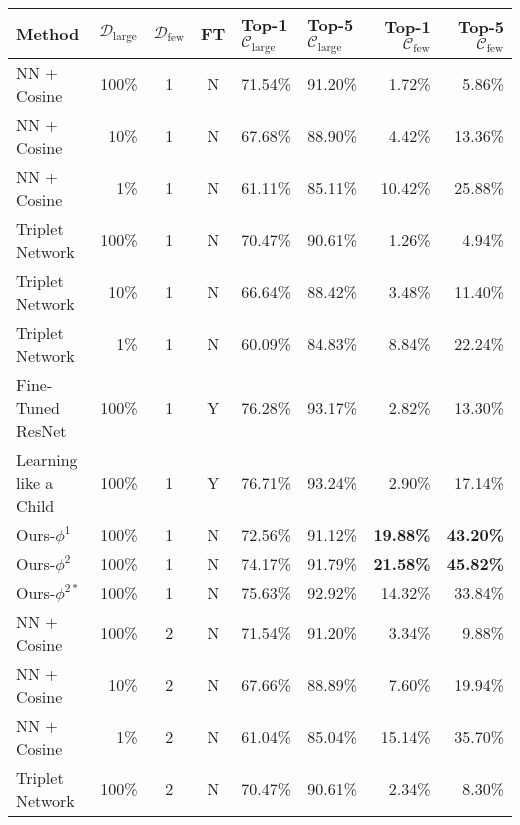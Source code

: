 \begin{table*}
    \small
    \centering
    \setlength{\tabcolsep}{1.0em}
    \begin{tabular}{lrccll:rr}
        \toprule
        Method & $\mathcal{D}_{\text{large}}$ & $\mathcal{D}_{\text{few}}$ & FT & Top-1 $\mathcal{C}_{\text{large}}$ & Top-5 $\mathcal{C}_{\text{large}}$ & Top-1 $\mathcal{C}_{\text{few}}$ & Top-5 $\mathcal{C}_{\text{few}}$\\
        \midrule
        NN + Cosine  & 100\% & 1 & N & 71.54\% & 91.20\% & 1.72\% & 5.86\% \\
        NN + Cosine  &  10\% & 1 & N & 67.68\% & 88.90\% & 4.42\% & 13.36\% \\
        NN + Cosine  &   1\% & 1 & N & 61.11\% & 85.11\% & 10.42\% & 25.88\% \\
        Triplet Network~\cite{siamese,lin2017transfer}  & 100\% & 1 & N & 70.47\% & 90.61\% & 1.26\% & 4.94\% \\
        Triplet Network~\cite{siamese,lin2017transfer}   &  10\% & 1 & N & 66.64\% & 88.42\% & 3.48\% & 11.40\% \\
        Triplet Network~\cite{siamese,lin2017transfer}   &   1\% & 1 & N & 60.09\% & 84.83\% & 8.84\% & 22.24\% \\
        Fine-Tuned ResNet~\cite{DBLP:conf/cvpr/HeZRS16} & 100\% & 1 & Y & 76.28\% & 93.17\% & 2.82\% & 13.30\% \\
        Learning like a Child~\cite{mao2015learning} & 100\% & 1 & Y & 76.71\% & 93.24\% & 2.90\% & 17.14\% \\
        \hdashline
        Ours-$\phi^1$         & 100\% & 1 & N & 72.56\% & 91.12\% & {\bf\color{blue}19.88\%} & {\bf\color{blue}43.20\%} \\
        Ours-$\phi^2$         & 100\% & 1 & N & 74.17\% & 91.79\% & {\bf\color{red}21.58\%} & {\bf\color{red}45.82\%} \\
        Ours-$\phi^{2*}$      & 100\% & 1 & N & 75.63\% & 92.92\% & 14.32\% & 33.84\% \\
        \midrule
        NN + Cosine  & 100\% & 2 & N & 71.54\% & 91.20\% & 3.34\% & 9.88\% \\
        NN + Cosine  &  10\% & 2 & N & 67.66\% & 88.89\% & 7.60\% & 19.94\% \\
        NN + Cosine  &   1\% & 2 & N & 61.04\% & 85.04\% & 15.14\% & 35.70\% \\
        Triplet Network~\cite{siamese,lin2017transfer}  & 100\% & 2 & N & 70.47\% & 90.61\% & 2.34\% & 8.30\% \\

\end{tabular}
\end{table*}
